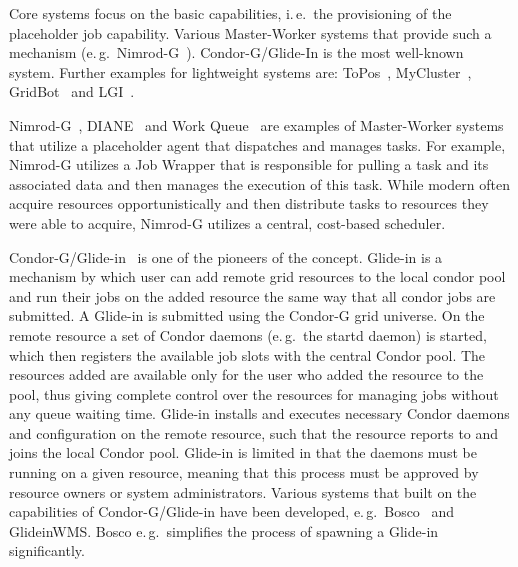 \documentclass{sig-alternate}
\begin{document}
Core \pilotjob systems focus on the basic \pilot capabilities, i.\,e.\ the
provisioning of the placeholder job capability. Various Master-Worker systems
that provide such a mechanism (e.\,g.\
Nimrod-G~\cite{10.1109/HPC.2000.846563}). Condor-G/Glide-In is the most
well-known \pilotjob system. Further examples for lightweight \pilotjob
systems are: ToPos~\cite{topos},
MyCluster~\cite{Walker:2007:PAC:1285840.1285848},
GridBot~\cite{Silberstein:2009:GEB:1654059.1654071} and LGI~\cite{lgi}.

Nimrod-G~\cite{10.1109/HPC.2000.846563}, DIANE~\cite{diane-thesis} and Work
Queue~\cite{workqueue-pyhpc2011} are examples of Master-Worker systems that
utilize a placeholder agent that dispatches and manages tasks. For example,
Nimrod-G utilizes a Job Wrapper that is responsible for pulling a task and its
associated data and then manages the execution of this task. While modern
\pilotjobs often acquire resources opportunistically and then distribute tasks
to resources they were able to acquire, Nimrod-G utilizes a central,
cost-based scheduler.

Condor-G/Glide-in~\cite{condor-g} is one of the pioneers of the \pilotjob
concept. Glide-in is a mechanism by which user can add remote grid resources
to the local condor pool and run their jobs on the added resource the same way
that all condor jobs are submitted. A Glide-in is submitted using the Condor-G
grid universe. On the remote resource a set of Condor daemons (e.\,g.\ the
startd daemon) is started, which then registers the available job slots with
the central Condor pool. The resources added are available only for the user
who added the resource to the pool, thus giving complete control over the
resources for managing jobs without any queue waiting time. Glide-in installs
and executes necessary Condor daemons and configuration on the remote
resource, such that the resource reports to and joins the local Condor pool.
Glide-in is limited in that the daemons must be running on a given resource,
meaning that this process must be approved by resource owners or system
administrators. Various systems that built on the \pilot capabilities of
Condor-G/Glide-in have been developed, e.\,g.\ Bosco~\cite{bosco} and
GlideinWMS. Bosco e.\,g.\ simplifies the process of spawning a Glide-in
significantly.



\end{document}
